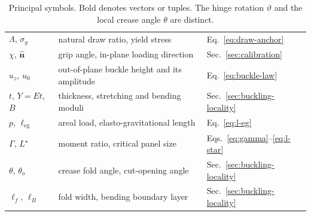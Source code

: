 \documentclass[pdflatex,sn-mathphys-num]{sn-jnl}%
\theoremstyle{thmstyleone}%
\theoremstyle{thmstyletwo}%
\theoremstyle{thmstylethree}%
\begin{document}
\begin{appendices}
\begin{table}[h!]
\begin{tabular}{lll}
$\Lambda$, $\sigma_y$                 & natural draw ratio, yield stress          & Eq.~\eqref{eq:draw-anchor} \\
$\chi$, $\hat{\bm n}$                 & grip angle, in-plane loading direction    & Sec.~\ref{sec:calibration} \\
$u_z$, $u_0$                          & out-of-plane buckle height and its amplitude & Eq.~\eqref{eq:buckle-law} \\
$t$, $Y=Et$, $B$                      & thickness, stretching and bending moduli  & Sec.~\ref{sec:buckling-locality} \\
$p$, $\ell_{\mathrm{eg}}$             & areal load, elasto-gravitational length   & Eq.~\eqref{eq:l-eg} \\
$\Gamma$, $L^\star$                   & moment ratio, critical panel size         & Eqs.~\eqref{eq:gamma}--\eqref{eq:l-star} \\
$\theta$, $\theta_o$                  & crease fold angle, cut-opening angle      & Sec.~\ref{sec:buckling-locality} \\
$\ell_f$, $\ell_B$                    & fold width, bending boundary layer        & Sec.~\ref{sec:buckling-locality} \\
\bottomrule
\end{tabular}
\caption{Principal symbols. Bold denotes vectors or tuples. The hinge rotation
$\vartheta$ and the local crease angle $\theta$ are distinct.}
\label{tab:notation}
\end{table}

\end{appendices}


\end{document}
